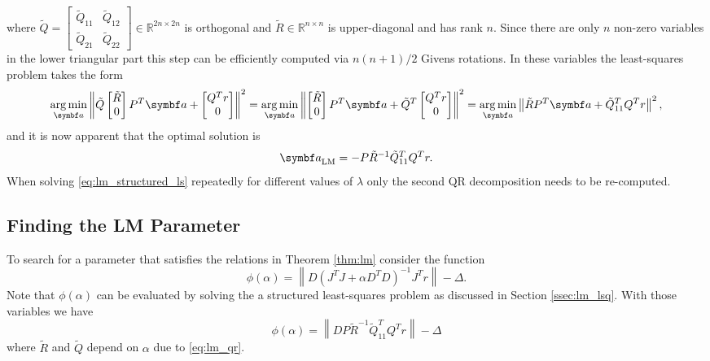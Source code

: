 where $\tilde Q = \begin{bmatrix} \tilde Q_{11} & \tilde Q_{12} \\ \tilde Q_{21} & \tilde Q_{22} \end{bmatrix} \in \mathbb{R}^{2n \times 2n}$ is orthogonal and $\tilde R \in \mathbb{R}^{n \times n}$ is upper-diagonal and has rank $n$. Since there are only $n$ non-zero variables in the lower triangular part this step can be efficiently computed via $n (n+1) / 2$ Givens rotations. In these variables the least-squares problem takes the form
\begin{equation*}
  \argmin_{\a} \left\| \tilde Q \begin{bmatrix} \tilde R \\ 0 \end{bmatrix} P^{T} \a + \begin{bmatrix} Q^{T} r \\ 0 \end{bmatrix} \right\|^2 =
  \argmin_{\a} \left\| \begin{bmatrix} \tilde R \\ 0 \end{bmatrix} P^{T} \a + \tilde Q^{T} \begin{bmatrix} Q^{T} r \\ 0 \end{bmatrix} \right\|^2 = \argmin_{\a} \left\| \tilde R P^{T} \a + \tilde Q_{11}^{T} Q^{T} r \right\|^{2},
\end{equation*}
and it is now apparent that the optimal solution is
\begin{equation}
  \label{eq:5}
  \a_{\textrm{LM}} = - P \tilde R^{-1} \tilde Q_{11}^{T} Q^{T} r.
\end{equation}
When solving \eqref{eq:lm_structured_ls} repeatedly for different values of $\lambda$ only the second QR decomposition needs to be re-computed.

\subsection{Finding the LM Parameter}

To search for a parameter that satisfies the relations in Theorem \ref{thm:lm} consider the function
\begin{equation}
  \phi(\alpha) = \left\| D \left(J^{T} J + \alpha D^{T} D \right)^{-1} J^{T} r \right\| - \Delta.
\end{equation}
Note that $\phi(\alpha)$ can be evaluated by solving the a structured least-squares problem as discussed in Section \ref{ssec:lm_lsq}. With those variables we have
\begin{equation}
  \phi(\alpha) = \left\| D P \tilde R^{-1} \tilde Q_{11}^{T} Q^{T} r \right\| - \Delta
\end{equation}
where $\tilde R$ and $\tilde Q$ depend on $\alpha$ due to \eqref{eq:lm_qr}.

